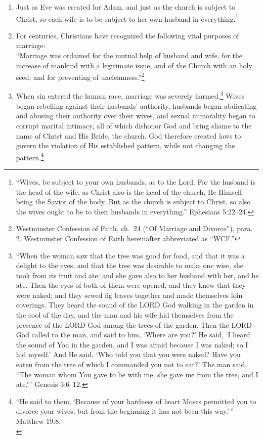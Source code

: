 \documentclass[
]{book}
\begin{document}
\begin{enumerate}
\item
  Just as Eve was created for Adam, and just as the church is subject to Christ, so each wife is to be subject to her own husband in everything.\footnote{``Wives, be subject to your own husbands, as to the Lord. For the husband is the head of the wife, as Christ also is the head of the church, He Himself being the Savior of the body. But as the church is subject to Christ, so also the wives ought to be to their husbands in everything.'' Ephesians 5:22--24.}
\item
  For centuries, Christians have recognized the following vital purposes of marriage:\\
  ``Marriage was ordained for the mutual help of husband and wife, for the increase of mankind with a legitimate issue, and of the Church with an holy seed; and for preventing of uncleanness.''\footnote{Westminster Confession of Faith, ch.~24 (``Of Marriage and Divorce''), para. 2. Westminster Confession of Faith hereinafter abbreviated as ``WCF.''}
\item
  When sin entered the human race, marriage was severely harmed.\footnote{``When the woman saw that the tree was good for food, and that it was a delight to the eyes, and that the tree was desirable to make one wise, she took from its fruit and ate; and she gave also to her husband with her, and he ate. Then the eyes of both of them were opened, and they knew that they were naked; and they sewed fig leaves together and made themselves loin coverings. They heard the sound of the LORD God walking in the garden in the cool of the day, and the man and his wife hid themselves from the presence of the LORD God among the trees of the garden. Then the LORD God called to the man, and said to him, `Where are you?' He said, `I heard the sound of You in the garden, and I was afraid because I was naked; so I hid myself.' And He said, `Who told you that you were naked? Have you eaten from the tree of which I commanded you not to eat?' The man said, ``The woman whom You gave to be with me, she gave me from the tree, and I ate.''' Genesis 3:6--12.} Wives began rebelling against their husbands' authority, husbands began abdicating and abusing their authority over their wives, and sexual immorality began to corrupt marital intimacy, all of which dishonor God and bring shame to the name of Christ and His Bride, the church. God therefore created laws to govern the violation of His established pattern, while not changing the pattern.\footnote{``He said to them, `Because of your hardness of heart Moses permitted you to divorce your wives; but from the beginning it has not been this way.'\,'' Matthew 19:8.\\
}
\end{enumerate}
\end{document}
